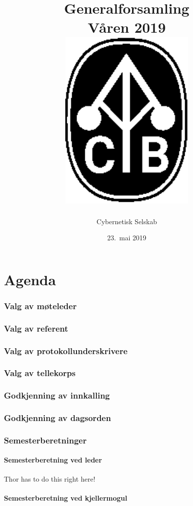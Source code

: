 \documentclass[10pt,norsk,a4paper]{article}
\title{Generalforsamling \\
	Våren 2019\\[3cm]
	\includegraphics[width=0.5\textwidth]{cyb-logo.eps}\\[-.5cm]}
\date{23.\ mai 2019}
\author{Cybernetisk Selskab}
\begin{document}
\maketitle{}
\newpage
\tableofcontents

\part*{Agenda}

\section{Valg av møteleder}

\section{Valg av referent}

\section{Valg av protokollunderskrivere}

\section{Valg av tellekorps}

\section{Godkjenning av innkalling}

\section{Godkjenning av dagsorden}


\section{Semesterberetninger}
\subsection{Semesterberetning ved leder}

Thor has to do this right here!

\subsection{Semesterberetning ved kjellermogul}
\end{document}
